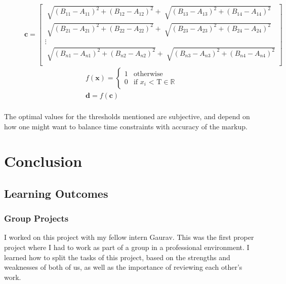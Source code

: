     \begin{figure}[h]
        \centering
        
        \[
        \pmb{c}=
        \begin{bmatrix}
            \sqrt[]{{(B_{11} - A_{11})}^2 + {(B_{12} - A_{12})}^2} + \sqrt[]{{(B_{13} - A_{13})}^2 + {(B_{14} - A_{14})}^2} \\
            \sqrt[]{{(B_{21} - A_{21})}^2 + {(B_{22} - A_{22})}^2} + \sqrt[]{{(B_{23} - A_{23})}^2 + {(B_{24} - A_{24})}^2} \\
            \vdots \\
            \sqrt[]{{(B_{n1} - A_{n1})}^2 + {(B_{n2} - A_{n2})}^2} + \sqrt[]{{(B_{n3} - A_{n3})}^2 + {(B_{n4} - A_{n4})}^2} \\
        \end{bmatrix}
        \]
        \begin{gather*}
            f(\pmb{x})=
        \begin{cases}
        1      & \text{otherwise}\\
        0      & \text{if $x_i$ < T} \in \mathbb{R} 
        \end{cases} \\
        \pmb{d} = f(\pmb{c}) \\
        \end{gather*}
        \caption{}
        \label{fig:ROIprocessing}
    \end{figure} 

    The optimal values for the thresholds mentioned are subjective, and depend on how one might want to balance time constraints with accuracy of the markup.


\section{Conclusion}
    \subsection{Learning Outcomes}
        \subsubsection{Group Projects}
        I worked on this project with my fellow intern Gaurav. This was the first proper project where I had to work as part of a group in a professional environment. I learned how to split the tasks of this project, based on the strengths and weaknesses of both of us, as well as the importance of reviewing each other's work.
